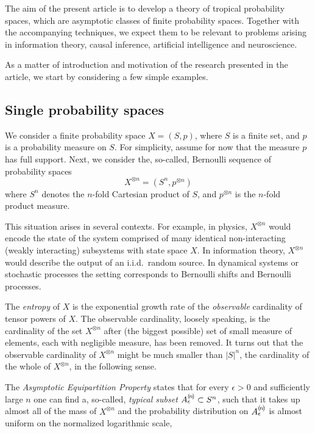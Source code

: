   The aim of the present article is to develop a theory of tropical
  probability spaces, which are asymptotic classes of finite
    probability spaces.  Together with the accompanying techniques,
  we expect them to be relevant to problems arising in information
  theory, causal inference, artificial intelligence and neuroscience.

  As a matter of introduction and motivation of the research presented
  in the article, we start by considering a few simple examples.

\subsection{Single probability spaces}\label{s:intro-single}
  We consider a {finite probability space} $X = (S, p)$, where $S$
  is a finite set, and $p$ is a probability measure on $S$. For
  simplicity, assume for now that the measure $p$ has full
  support. Next, we consider the, so-called, Bernoulli sequence of
  {probability spaces}
  \[
  X^{\otimes n} = ( S^n, p^{\otimes n})
  \] 
  where $S^n$ denotes the $n$-fold Cartesian product of $S$, and
  $p^{\otimes n}$ is the $n$-fold product measure. 
  
  This situation arises in several contexts.  For example, in physics,
  $X^{\otimes n}$ would encode the state of the system comprised of many
  identical non-interacting (weakly interacting) subsystems with state
  space $X$.  In information theory, $X^{\otimes n}$ would describe the
  output of an i.i.d.~random source.  In dynamical systems or stochastic
  processes the setting corresponds to Bernoulli shifts and Bernoulli
  processes.
  
  The \emph{entropy} of $X$ is the exponential growth rate of the
  \emph{observable} cardinality of tensor powers of $X$.  The
  observable cardinality, loosely speaking, is the cardinality of the
  set $X^{\otimes n}$ after (the biggest possible) set of small measure
  of elements, each with negligible measure, has been removed.  It turns
  out that the observable cardinality of $X^{\otimes n}$ might be much
  smaller than $|S|^{n}$, the cardinality of the whole of $X^{\otimes
    n}$, in the following sense.

  The \emph{Asymptotic Equipartition Property} states that for every
  $\epsilon>0$ and sufficiently large $n$ one can find a, so-called,
  \emph{typical subset} $A^{\c n}_{\epsilon}\subset S^{n}$, such that
  it takes up almost all of the mass of $X^{\otimes n}$ and the
  probability distribution on $A^{\c n}_{\epsilon}$ is almost uniform
  on the normalized logarithmic scale,
  
